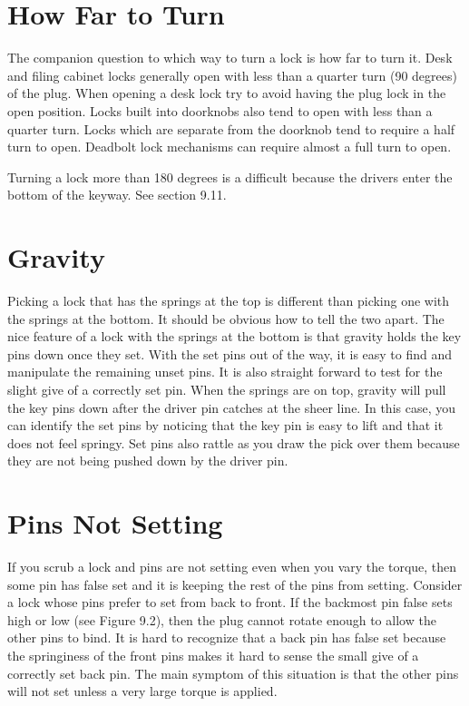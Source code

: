 \section{How Far to Turn}
The companion question to which way to turn a lock is how far to turn it. Desk and filing
cabinet locks generally open with less than a quarter turn (90 degrees) of the plug. When
opening a desk lock try to avoid having the plug lock in the open position. Locks built into
doorknobs also tend to open with less than a quarter turn. Locks which are separate from
the doorknob tend to require a half turn to open. Deadbolt lock mechanisms can require
almost a full turn to open.

Turning a lock more than 180 degrees is a difficult because the drivers enter the bottom
of the keyway. See section 9.11.

\section{Gravity}
Picking a lock that has the springs at the top is different than picking one with the springs
at the bottom. It should be obvious how to tell the two apart. The nice feature of a lock
with the springs at the bottom is that gravity holds the key pins down once they set. With
the set pins out of the way, it is easy to find and manipulate the remaining unset pins. It is
also straight forward to test for the slight give of a correctly set pin. When the springs are
on top, gravity will pull the key pins down after the driver pin catches at the sheer line. In
this case, you can identify the set pins by noticing that the key pin is easy to lift and that it
does not feel springy. Set pins also rattle as you draw the pick over them because they are
not being pushed down by the driver pin.

\section{Pins Not Setting}
If you scrub a lock and pins are not setting even when you vary the torque, then some pin
has false set and it is keeping the rest of the pins from setting. Consider a lock whose pins
prefer to set from back to front. If the backmost pin false sets high or low (see Figure 9.2),
then the plug cannot rotate enough to allow the other pins to bind. It is hard to recognize
that a back pin has false set because the springiness of the front pins makes it hard to sense
the small give of a correctly set back pin. The main symptom of this situation is that the
other pins will not set unless a very large torque is applied.


